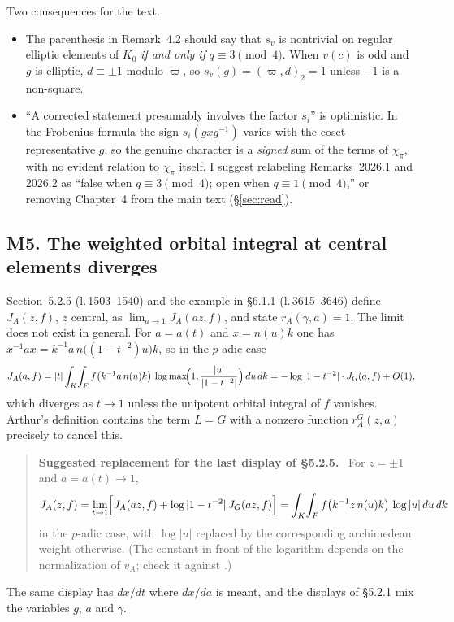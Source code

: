 \documentclass[12pt,letterpaper]{article}
\newcommand{\lref}[1]{\textup{(l.\,#1)}}
\theoremstyle{plain}
\newenvironment{fix}[1][Suggested text]%
  {\begin{quote}\small\noindent\textbf{#1.}\ }%
  {\end{quote}}
\begin{document}
Two consequences for the text.
\begin{itemize}
\item The parenthesis in Remark~4.2 should say that $s_v$ is nontrivial on
regular elliptic elements of $K_0$ \emph{if and only if}
$q\equiv3\pmod4$. When $v(c)$ is odd and $g$ is elliptic, $d\equiv\pm1$
modulo $\varpi$, so $s_v(g)=(\varpi,d)_2=1$ unless $-1$ is a non-square.
\item ``A corrected statement presumably involves the factor $s_i$'' is
optimistic. In the Frobenius formula the sign
$s_i(gxg^{-1})$ varies with the coset representative $g$, so the genuine
character is a \emph{signed} sum of the terms of $\chi_\pi$, with no
evident relation to $\chi_\pi$ itself. I suggest relabeling
Remarks~2026.1 and 2026.2 as ``false when $q\equiv3\pmod4$; open when
$q\equiv1\pmod4$,'' or removing Chapter~4 from the main text
(\S\ref{sec:read}).
\end{itemize}

\subsection*{M5. The weighted orbital integral at central elements diverges}

Section~5.2.5 \lref{1503--1540} and the example in \S6.1.1
\lref{3615--3646} define $J_A(z,f)$, $z$ central, as
$\lim_{a\to1}J_A(az,f)$, and state $r_A(\gamma,a)=1$. The limit does not
exist in general. For $a=a(t)$ and $x=n(u)k$ one has
$x^{-1}ax=k^{-1}a\,n\bigl((1-t^{-2})u\bigr)k$, so in the $p$-adic case
\[
J_A(a,f)=|t|\int_K\!\int_F f\bigl(k^{-1}a\,n(u)k\bigr)\,
\log\max\!\Bigl(1,\frac{|u|}{|1-t^{-2}|}\Bigr)\,du\,dk
=-\log|1-t^{-2}|\cdot J_G(a,f)+O(1),
\]
which diverges as $t\to1$ unless the unipotent orbital integral of $f$
vanishes. Arthur's definition \cite[(8.1)]{A7} contains the term $L=G$
with a nonzero function $r_A^G(z,a)$ precisely to cancel this.

\begin{fix}[Suggested replacement for the last display of \S5.2.5]
For $z=\pm1$ and $a=a(t)\to1$,
\[
J_A(z,f)=\lim_{t\to1}\Bigl[J_A(az,f)+\log|1-t^{-2}|\,J_G(az,f)\Bigr]
=\int_K\!\int_F f\bigl(k^{-1}z\,n(u)k\bigr)\,\log|u|\,du\,dk
\]
in the $p$-adic case, with $\log|u|$ replaced by the corresponding
archimedean weight otherwise. (The constant in front of the logarithm
depends on the normalization of $v_A$; check it against \cite{A7}.)
\end{fix}

The same display has $dx/dt$ where $dx/da$ is meant, and the displays of
\S5.2.1 mix the variables $g$, $a$ and $\gamma$.
\end{document}

